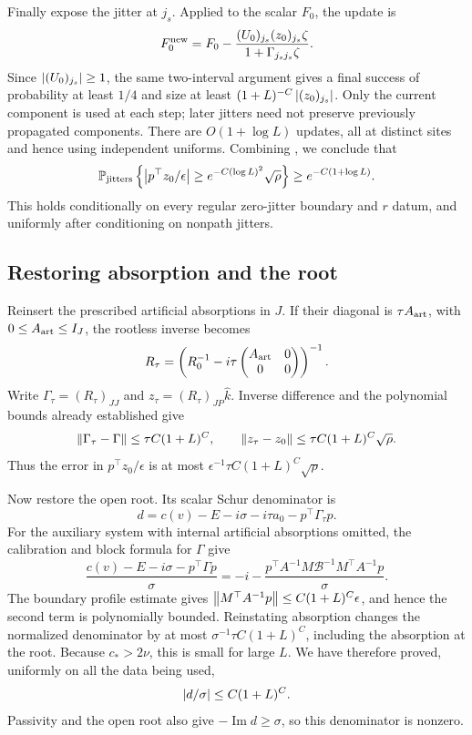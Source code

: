 Finally expose the jitter at $j_s$. Applied to the scalar $F_0$,
the update is
\[
 F_0^{\rm new}=F_0-
 \frac{(U_0)_{j_s}(z_0)_{j_s}\zeta}
      {1+\Gamma_{j_sj_s}\zeta}.
\]
Since $\left\lvert(U_0)_{j_s}\right\rvert\ge1$, the same two-interval argument
gives a final success of probability at least $1/4$ and size at least
$(1+L)^{-C}\left\lvert(z_0)_{j_s}\right\rvert$. Only the current component is used
at each step; later jitters need not preserve previously propagated
components. There are $O(1+\log L)$ updates, all at distinct sites
and hence using independent uniforms. Combining
, we conclude that
\begin{equation}
 \mathbb P_{\rm jitters}\left\{
   \left\lvert p^\top z_0/\epsilon\right\rvert
     \ge e^{-C(\log L)^2}\sqrt\rho\right\}
 \ge e^{-C(1+\log L)}.
 \label{trans:jitter-success}
\end{equation}
This holds conditionally on every regular zero-jitter boundary and
$r$ datum, and uniformly after conditioning on nonpath jitters.

\subsection{Restoring absorption and the root}

Reinsert the prescribed artificial absorptions in $J$. If their
diagonal is $\tau A_{\rm art}$, with $0\le A_{\rm art}\le I_J$,
the rootless inverse becomes
\[
 R_\tau=
 \left(R_0^{-1}-i\tau\begin{pmatrix}A_{\rm art}&0\\0&0\end{pmatrix}
 \right)^{-1}.
\]
Write $\Gamma_\tau=(R_\tau)_{JJ}$ and
$z_\tau=(R_\tau)_{JP}\widehat k$. Inverse difference and the
polynomial bounds already established give
\begin{equation}
 \left\lVert\Gamma_\tau-\Gamma\right\rVert\le\tau C(1+L)^C,\qquad
 \left\lVert z_\tau-z_0\right\rVert\le\tau C(1+L)^C\sqrt\rho.
 \label{trans:absorption-errors}
\end{equation}
Thus the error in $p^\top z_0/\epsilon$ is at most
$\epsilon^{-1}\tau C(1+L)^C\sqrt\rho$.

Now restore the open root. Its scalar Schur denominator is
\[
 d=c(v)-E-i\sigma-i\tau a_0-p^\top\Gamma_\tau p.
\]
For the auxiliary system with internal artificial absorptions omitted,
the calibration and block formula for $\Gamma$ give
\begin{equation}
 \frac{c(v)-E-i\sigma-p^\top\Gamma p}{\sigma}
 =-i-\frac{p^\top A^{-1}M\mathcal B^{-1}M^\top A^{-1}p}{\sigma}.
 \label{trans:root-denominator}
\end{equation}
The boundary profile estimate gives
$\left\lVert M^\top A^{-1}p\right\rVert\le C(1+L)^C\epsilon$, and hence the
second term is polynomially bounded. Reinstating absorption changes
the normalized denominator by at most
$\sigma^{-1}\tau C(1+L)^C$, including the absorption at the root.
Because $c_*>2\nu$, this is small for large $L$. We have therefore
proved, uniformly on all the data being used,
\[
 \left\lvert d/\sigma\right\rvert\le C(1+L)^C.
\]
Passivity and the open root also give $-\operatorname{Im}d\ge\sigma$,
so this denominator is nonzero.

